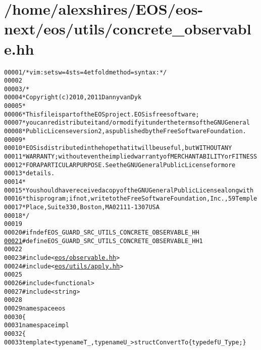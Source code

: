 \hypertarget{concrete__observable_8hh_source}{
\section{/home/alexshires/EOS/eos-\/next/eos/utils/concrete\_\-observable.hh}
}


\begin{footnotesize}\begin{alltt}
00001 \textcolor{comment}{/* vim: set sw=4 sts=4 et foldmethod=syntax : */}
00002 
00003 \textcolor{comment}{/*}
00004 \textcolor{comment}{ * Copyright (c) 2010, 2011 Danny van Dyk}
00005 \textcolor{comment}{ *}
00006 \textcolor{comment}{ * This file is part of the EOS project. EOS is free software;}
00007 \textcolor{comment}{ * you can redistribute it and/or modify it under the terms of the GNU General}
00008 \textcolor{comment}{ * Public License version 2, as published by the Free Software Foundation.}
00009 \textcolor{comment}{ *}
00010 \textcolor{comment}{ * EOS is distributed in the hope that it will be useful, but WITHOUT ANY}
00011 \textcolor{comment}{ * WARRANTY; without even the implied warranty of MERCHANTABILITY or FITNESS}
00012 \textcolor{comment}{ * FOR A PARTICULAR PURPOSE.  See the GNU General Public License for more}
00013 \textcolor{comment}{ * details.}
00014 \textcolor{comment}{ *}
00015 \textcolor{comment}{ * You should have received a copy of the GNU General Public License along with}
00016 \textcolor{comment}{ * this program; if not, write to the Free Software Foundation, Inc., 59 Temple}
00017 \textcolor{comment}{ * Place, Suite 330, Boston, MA  02111-1307  USA}
00018 \textcolor{comment}{ */}
00019 
00020 \textcolor{preprocessor}{#ifndef EOS\_GUARD\_SRC\_UTILS\_CONCRETE\_OBSERVABLE\_HH}
\hypertarget{concrete__observable_8hh_source_l00021}{}\hyperlink{concrete__observable_8hh_acd6abb229f6dbdbe16b1875ab4596894}{00021} \textcolor{preprocessor}{}\textcolor{preprocessor}{#define EOS\_GUARD\_SRC\_UTILS\_CONCRETE\_OBSERVABLE\_HH 1}
00022 \textcolor{preprocessor}{}
00023 \textcolor{preprocessor}{#include <\hyperlink{observable_8hh}{eos/observable.hh}>}
00024 \textcolor{preprocessor}{#include <\hyperlink{apply_8hh}{eos/utils/apply.hh}>}
00025 
00026 \textcolor{preprocessor}{#include <functional>}
00027 \textcolor{preprocessor}{#include <string>}
00028 
00029 \textcolor{keyword}{namespace }eos
00030 \{
00031     \textcolor{keyword}{namespace }impl
00032     \{
00033         \textcolor{keyword}{template} <\textcolor{keyword}{typename} T\_, \textcolor{keyword}{typename} U\_> \textcolor{keyword}{struct }ConvertTo \{ \textcolor{keyword}{typedef} U\_ Type; \}

\end{alltt}
\end{footnotesize}

